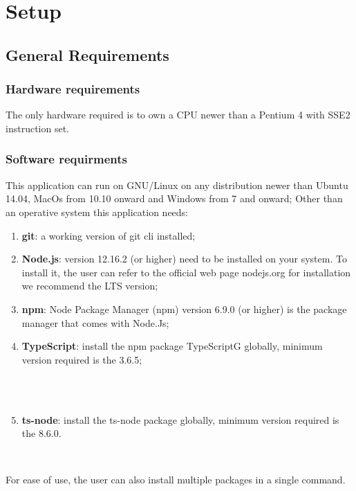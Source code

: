 \section{Setup}
\subsection{General Requirements}
\subsubsection{Hardware requirements}
The only hardware required is to own a CPU newer than a Pentium 4 with SSE2 instruction set.
\subsubsection{Software requirments}
This application can run on GNU/Linux on any distribution newer than Ubuntu 14.04, MacOs from 10.10 onward and Windows from 7 and onward;
Other than an operative system this application needs:
\begin{enumerate}
	\item \textbf{git}: a working version of git cli installed;
    \item \textbf{Node.js}: version 12.16.2 (or higher) need to be installed on your system. To install it, the user can refer to the official web page nodejs.org for installation we recommend the LTS version;
    \item \textbf{npm}: Node Package Manager (npm) version 6.9.0 (or higher) is the package manager that comes with Node.Js;
    \item \textbf{TypeScript}: install the npm package TypeScriptG globally, minimum version required is the 3.6.5;\\\\ \centerline{}\\
    \item \textbf{ts-node}: install the ts-node package globally, minimum version required is the 8.6.0. \newline\newline \centerline{}\\
\end{enumerate}
For ease of use, the user can also install multiple packages in a single command.
\begin{center}
\end{center}
